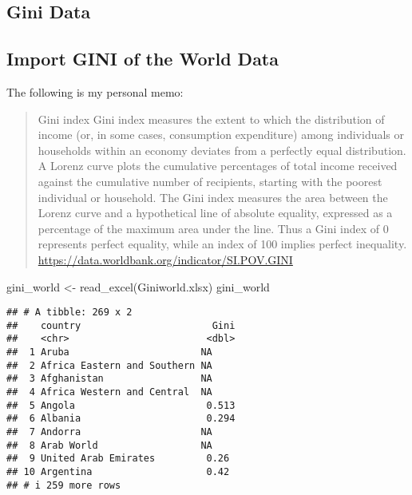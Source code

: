 \documentclass[
]{article}
\newenvironment{Shaded}{\begin{snugshade}}{\end{snugshade}}
\newcommand{\FunctionTok}[1]{\textcolor[rgb]{0.00,0.00,0.00}{#1}}
\newcommand{\NormalTok}[1]{#1}
\newcommand{\OtherTok}[1]{\textcolor[rgb]{0.56,0.35,0.01}{#1}}
\newcommand{\StringTok}[1]{\textcolor[rgb]{0.31,0.60,0.02}{#1}}
\begin{document}
\hypertarget{gini-data}{%
\subsection{Gini Data}\label{gini-data}}

\hypertarget{import-gini-of-the-world-data}{%
\subsection{Import GINI of the World
Data}\label{import-gini-of-the-world-data}}

The following is my personal memo:

\begin{quote}
Gini index Gini index measures the extent to which the distribution of
income (or, in some cases, consumption expenditure) among individuals or
households within an economy deviates from a perfectly equal
distribution. A Lorenz curve plots the cumulative percentages of total
income received against the cumulative number of recipients, starting
with the poorest individual or household. The Gini index measures the
area between the Lorenz curve and a hypothetical line of absolute
equality, expressed as a percentage of the maximum area under the line.
Thus a Gini index of 0 represents perfect equality, while an index of
100 implies perfect inequality.
\url{https://data.worldbank.org/indicator/SI.POV.GINI}
\end{quote}

\begin{Shaded}
\begin{Highlighting}[]
\NormalTok{gini\_world }\OtherTok{\textless{}{-}} \FunctionTok{read\_excel}\NormalTok{(}\StringTok{\textquotesingle{}Giniworld.xlsx\textquotesingle{}}\NormalTok{)}
\NormalTok{gini\_world}
\end{Highlighting}
\end{Shaded}

\begin{verbatim}
## # A tibble: 269 x 2
##    country                       Gini
##    <chr>                        <dbl>
##  1 Aruba                       NA    
##  2 Africa Eastern and Southern NA    
##  3 Afghanistan                 NA    
##  4 Africa Western and Central  NA    
##  5 Angola                       0.513
##  6 Albania                      0.294
##  7 Andorra                     NA    
##  8 Arab World                  NA    
##  9 United Arab Emirates         0.26 
## 10 Argentina                    0.42 
## # i 259 more rows
\end{verbatim}
\end{document}
